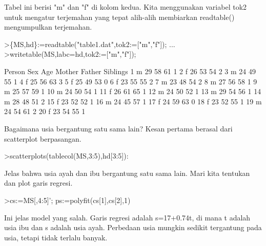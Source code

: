 \documentclass[a4paper,10pt]{article}
\begin{document}
\begin{eulernotebook}
\begin{eulercomment}
Tabel ini berisi "m" dan "f" di kolom kedua. Kita menggunakan variabel
tok2 untuk mengatur terjemahan yang tepat alih-alih membiarkan
readtable() mengumpulkan terjemahan.
\end{eulercomment}
\begin{eulerprompt}
>\{MS,hd\}:=readtable("table1.dat",tok2:=["m","f"]);  ...
>writetable(MS,labc=hd,tok2:=["m","f"]);
\end{eulerprompt}
\begin{euleroutput}
      Person       Sex       Age    Mother    Father  Siblings
           1         m        29        58        61         1
           2         f        26        53        54         2
           3         m        24        49        55         1
           4         f        25        56        63         3
           5         f        25        49        53         0
           6         f        23        55        55         2
           7         m        23        48        54         2
           8         m        27        56        58         1
           9         m        25        57        59         1
          10         m        24        50        54         1
          11         f        26        61        65         1
          12         m        24        50        52         1
          13         m        29        54        56         1
          14         m        28        48        51         2
          15         f        23        52        52         1
          16         m        24        45        57         1
          17         f        24        59        63         0
          18         f        23        52        55         1
          19         m        24        54        61         2
          20         f        23        54        55         1
\end{euleroutput}
\begin{eulercomment}
Bagaimana usia bergantung satu sama lain? Kesan pertama berasal dari
scatterplot berpasangan.
\end{eulercomment}
\begin{eulerprompt}
>scatterplots(tablecol(MS,3:5),hd[3:5]):
\end{eulerprompt}
\begin{eulercomment}
Jelas bahwa usia ayah dan ibu bergantung satu sama lain. Mari kita
tentukan dan plot garis regresi.
\end{eulercomment}
\begin{eulerprompt}
>cs:=MS[,4:5]'; ps:=polyfit(cs[1],cs[2],1)
\end{eulerprompt}
\begin{euleroutput}
  [17.3789,  0.740964]
\end{euleroutput}
\begin{eulercomment}
Ini jelas model yang salah. Garis regresi adalah s=17+0.74t, di mana t
adalah usia ibu dan s adalah usia ayah. Perbedaan usia mungkin sedikit
tergantung pada usia, tetapi tidak terlalu banyak.


\end{eulercomment}
\end{eulernotebook}
\end{document}
